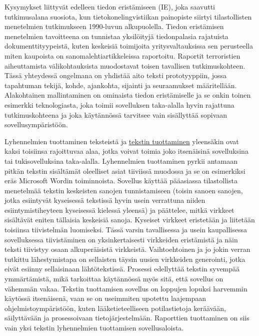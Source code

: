 \documentclass[]{../../metanetpaper}
\begin{document}
\begin{multicols}{2}
Kysymykset liittyvät edelleen tiedon eristämiseen (IE), joka saavutti
tutkimusalana suosiota, kun tietokonelingvistiikan painopiste siirtyi
tilastollisten menetelmien tutkimukseen 1990-luvun
alkupuolella. Tiedon eristämisen menetelmien tavoitteena on tunnistaa
yksilöityjä tiedonpalasia rajatuista dokumenttityypeistä, kuten
keskeisiä toimijoita yritysvaltauksissa sen perusteella miten
kaupoista on sanomalehtiartikkeleissa raportoitu.  Raportit
terroristien aiheuttamista välikohtauksista muodostavat toisen
tavallisen tutkimuskohteen. Tässä yhteydessä ongelmana on yhdistää
aito teksti prototyyppiin, jossa tapahtuman tekijä, kohde, ajankohta,
sijainti ja seuraamukset määritellään. Alakohtainen mallintaminen on
ominaista tiedon eristämiselle ja se onkin toinen esimerkki
teknologiasta, joka toimii sovelluksen taka-alalla hyvin rajattuna
tutkimuskohteena ja joka käytännössä tarvitsee vain sisällyttää
sopivaan sovellusympäristöön.


Lyhennelmien tuottaminen teksteistä ja \underline{tekstin tuottaminen}
yleensäkin ovat kaksi toisiinsa rajoittuvaa alaa, jotka voivat toimia joko
itsenäisinä sovelluksina tai tukisovelluksina
taka-alalla. Lyhennelmien tuottaminen pyrkii antamaan pitkän tekstin
sisältämät oleelliset asiat tiiviissä muodossa ja se on esimerkiksi
eräs Microsoft Wordin toiminnoista. Sovellus käyttää pääasiassa
tilastollista menetelmää tekstin keskeisten sanojen tunnistamiseen
(toisin sanoen sanojen, jotka esiintyvät kyseisessä tekstissä hyvin
usein verrattuna niiden esiintymistiheyteen kyseisessä kielessä
yleensä) ja päättelee, mitkä virkkeet sisältävät eniten tällaisia
keskeisiä sanoja. Kyseiset virkkeet eristetään ja liitetään toisiinsa
tiivistelmän luomiseksi. Tässä varsin tavallisessa ja usein
kaupallisessa sovelluksessa tiivistäminen on yksinkertaisesti
virkkeiden eristämistä ja näin teksti tiivistyy osaan alkuperäisistä
virkkeistä. Vaihtoehtoinen ja jo jokin verran tutkittu lähestymistapa
on sellaisten täysin uusien virkkeiden generointi, jotka eivät esiinny
sellaisinaan lähtötekstissä. Prosessi edellyttää tekstin syvempää
ymmärtämistä, mikä tarkoittaa käytännössä myös sitä, että sovellus on
vähemmän vakaa. Tekstin tuottamisen sovellus on loppujen lopuksi
harvemmin käytössä itsenäisenä, vaan se on useimmiten upotettu
laajempaan ohjelmistoympäristöön, kuten lääketieteelliseen
potilastietoja keräävään, säilyttävään ja prosessoivaan
tietojärjestelmään. Raporttien tuottaminen on siis vain yksi tekstin
lyhennelmien tuottamisen sovellusaloista.


\end{multicols}
\end{document}
